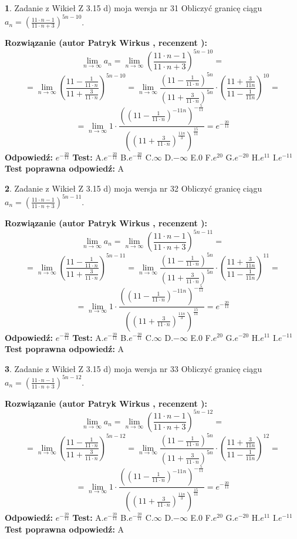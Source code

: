 \documentclass[12pt, a4paper]{article}
\theoremstyle{definition} %
\newtheorem{zad}{}
\newcommand{\zadStart}[1]{\begin{zad}#1\newline}
\newcommand{\zadStop}{\end{zad}}
\newcommand{\rozwStart}[2]{\noindent \textbf{Rozwiązanie (autor #1 , recenzent #2): }\newline}
\newcommand{\rozwStop}{\newline}
\newcommand{\odpStart}{\noindent \textbf{Odpowiedź:}\newline}
\newcommand{\odpStop}{\newline}
\newcommand{\testStart}{\noindent \textbf{Test:}\newline}
\newcommand{\testStop}{\newline}
\newcommand{\kluczStart}{\noindent \textbf{Test poprawna odpowiedź:}\newline}
\newcommand{\kluczStop}{\newline}
\begin{document}
\zadStart{Zadanie z Wikieł Z 3.15 d) moja wersja nr 31}
Obliczyć granicę ciągu $a_{n}=(\frac{11\cdot n - 1}{11 \cdot n + 3})^{5n-10}$.
\zadStop
\rozwStart{Patryk Wirkus}{}
$$\lim\limits_{n\to\infty} a_{n} = \lim\limits_{n\to\infty}(\frac{11\cdot n - 1}{11 \cdot n + 3})^{5n-10}=$$
$$=\lim\limits_{n\to\infty}(\frac{11 - \frac{1}{11\cdot n}}{11 + \frac{3}{11 \cdot n}})^{5n-10}=\lim\limits_{n\to\infty}\frac{(11 - \frac{1}{11\cdot n})^{5n}}{(11 + \frac{3}{11\cdot n})^{5n}} \cdot (\frac{11+\frac{3}{11n}}{11-\frac{1}{11n}})^{10}=$$
$$=\lim\limits_{n\to\infty} 1 \cdot \frac{((11-\frac{1}{11 \cdot n})^{-11n})^{-\frac{5}{11}}}{((11+\frac{3}{11 \cdot n})^{\frac{11n}{3}})^{\frac{15}{11}}} =e^{-\frac{20}{11}}$$
\rozwStop
\odpStart
$e^{-\frac{20}{11}}$
\odpStop
\testStart
A.$ e^{-\frac{20}{11}}$
B.$ e^{-\frac{20}{11}}$
C.$\infty$
D.$-\infty$
E.$0$
F.$e^{20}$
G.$e^{-20}$
H.$e^{11}$
I.$e^{-11}$
\testStop
\kluczStart
A
\kluczStop



\zadStart{Zadanie z Wikieł Z 3.15 d) moja wersja nr 32}
Obliczyć granicę ciągu $a_{n}=(\frac{11\cdot n - 1}{11 \cdot n + 3})^{5n-11}$.
\zadStop
\rozwStart{Patryk Wirkus}{}
$$\lim\limits_{n\to\infty} a_{n} = \lim\limits_{n\to\infty}(\frac{11\cdot n - 1}{11 \cdot n + 3})^{5n-11}=$$
$$=\lim\limits_{n\to\infty}(\frac{11 - \frac{1}{11\cdot n}}{11 + \frac{3}{11 \cdot n}})^{5n-11}=\lim\limits_{n\to\infty}\frac{(11 - \frac{1}{11\cdot n})^{5n}}{(11 + \frac{3}{11\cdot n})^{5n}} \cdot (\frac{11+\frac{3}{11n}}{11-\frac{1}{11n}})^{11}=$$
$$=\lim\limits_{n\to\infty} 1 \cdot \frac{((11-\frac{1}{11 \cdot n})^{-11n})^{-\frac{5}{11}}}{((11+\frac{3}{11 \cdot n})^{\frac{11n}{3}})^{\frac{15}{11}}} =e^{-\frac{20}{11}}$$
\rozwStop
\odpStart
$e^{-\frac{20}{11}}$
\odpStop
\testStart
A.$ e^{-\frac{20}{11}}$
B.$ e^{-\frac{20}{11}}$
C.$\infty$
D.$-\infty$
E.$0$
F.$e^{20}$
G.$e^{-20}$
H.$e^{11}$
I.$e^{-11}$
\testStop
\kluczStart
A
\kluczStop



\zadStart{Zadanie z Wikieł Z 3.15 d) moja wersja nr 33}
Obliczyć granicę ciągu $a_{n}=(\frac{11\cdot n - 1}{11 \cdot n + 3})^{5n-12}$.
\zadStop
\rozwStart{Patryk Wirkus}{}
$$\lim\limits_{n\to\infty} a_{n} = \lim\limits_{n\to\infty}(\frac{11\cdot n - 1}{11 \cdot n + 3})^{5n-12}=$$
$$=\lim\limits_{n\to\infty}(\frac{11 - \frac{1}{11\cdot n}}{11 + \frac{3}{11 \cdot n}})^{5n-12}=\lim\limits_{n\to\infty}\frac{(11 - \frac{1}{11\cdot n})^{5n}}{(11 + \frac{3}{11\cdot n})^{5n}} \cdot (\frac{11+\frac{3}{11n}}{11-\frac{1}{11n}})^{12}=$$
$$=\lim\limits_{n\to\infty} 1 \cdot \frac{((11-\frac{1}{11 \cdot n})^{-11n})^{-\frac{5}{11}}}{((11+\frac{3}{11 \cdot n})^{\frac{11n}{3}})^{\frac{15}{11}}} =e^{-\frac{20}{11}}$$
\rozwStop
\odpStart
$e^{-\frac{20}{11}}$
\odpStop
\testStart
A.$ e^{-\frac{20}{11}}$
B.$ e^{-\frac{20}{11}}$
C.$\infty$
D.$-\infty$
E.$0$
F.$e^{20}$
G.$e^{-20}$
H.$e^{11}$
I.$e^{-11}$
\testStop
\kluczStart
A
\kluczStop
\end{document}

